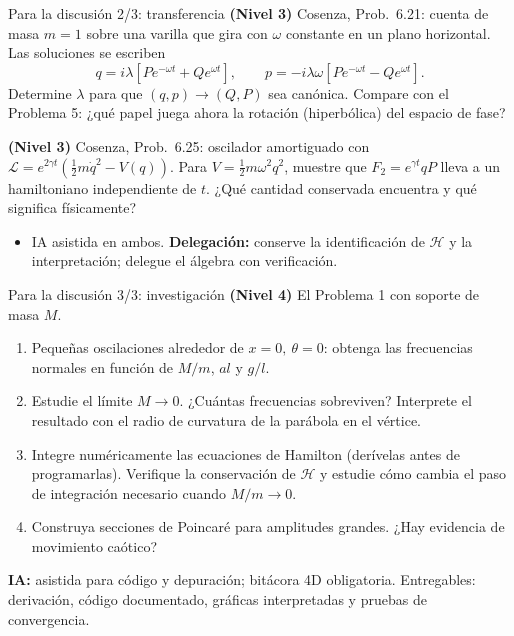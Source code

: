 \documentclass[spanish]{beamer}
\newcommand{\Lag}{\mathcal{L}}
\newcommand{\Ham}{\mathcal{H}}
\begin{document}
\begin{frame}{Para la discusión 2/3: transferencia}
\textbf{(Nivel 3)} Cosenza, Prob.~6.21: cuenta de masa $m=1$ sobre una varilla que
gira con $\omega$ constante en un plano horizontal. Las soluciones se escriben
\[
  q = i\lambda\left[P e^{-\omega t} + Q e^{\omega t}\right], \qquad
  p = -i\lambda\omega\left[P e^{-\omega t} - Q e^{\omega t}\right].
\]
Determine $\lambda$ para que $(q,p)\to(Q,P)$ sea canónica. Compare con el
Problema 5: ¿qué papel juega ahora la rotación (hiperbólica) del espacio de fase?
\vspace{0.2cm}

\textbf{(Nivel 3)} Cosenza, Prob.~6.25: oscilador amortiguado con
$\Lag = e^{2\gamma t}\left(\tfrac12 m\dot q^2 - V(q)\right)$. Para
$V=\tfrac12 m\omega^2q^2$, muestre que $F_2 = e^{\gamma t}qP$ lleva a un
hamiltoniano independiente de $t$.
¿Qué cantidad conservada encuentra y qué significa físicamente?
\begin{itemize}
  \item IA asistida en ambos. \textbf{Delegación:} conserve la identificación
        de $\Ham$ y la interpretación; delegue el álgebra con verificación.
\end{itemize}
\end{frame}

\begin{frame}{Para la discusión 3/3: investigación}
\textbf{(Nivel 4)} El Problema 1 con soporte de masa $M$.
\begin{enumerate}
  \item Pequeñas oscilaciones alrededor de $x=0,\ \theta=0$: obtenga las
        frecuencias normales en función de $M/m$, $al$ y $g/l$.
  \item Estudie el límite $M\to 0$. ¿Cuántas frecuencias sobreviven? Interprete
        el resultado con el radio de curvatura de la parábola en el vértice.
  \item Integre numéricamente las ecuaciones de Hamilton (derívelas antes de
        programarlas). Verifique la conservación de $\Ham$ y estudie cómo cambia
        el paso de integración necesario cuando $M/m\to 0$.
  \item Construya secciones de Poincaré para amplitudes grandes. ¿Hay
        evidencia de movimiento caótico?
\end{enumerate}
\textbf{IA:} asistida para código y depuración; bitácora 4D obligatoria.
Entregables: derivación, código documentado, gráficas interpretadas y
pruebas de convergencia.
\end{frame}
\end{document}
